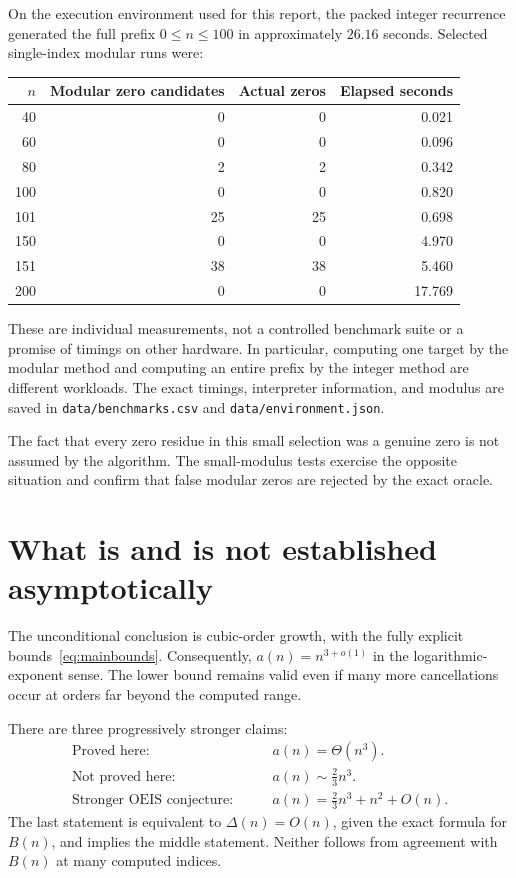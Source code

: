 \documentclass[11pt]{article}
\numberwithin{equation}{section}
\theoremstyle{definition}
\theoremstyle{remark}
\begin{document}
On the execution environment used for this report, the packed integer
recurrence generated the full prefix $0\le n\le100$ in approximately
$26.16$ seconds. Selected single-index modular runs were:
\begin{center}
\begin{tabular}{rrrr}
\toprule
$n$ & Modular zero candidates & Actual zeros & Elapsed seconds\\
\midrule
40 & 0 & 0 & 0.021\\
60 & 0 & 0 & 0.096\\
80 & 2 & 2 & 0.342\\
100 & 0 & 0 & 0.820\\
101 & 25 & 25 & 0.698\\
150 & 0 & 0 & 4.970\\
151 & 38 & 38 & 5.460\\
200 & 0 & 0 & 17.769\\
\bottomrule
\end{tabular}
\end{center}
These are individual measurements, not a controlled benchmark suite or a
promise of timings on other hardware. In particular, computing one target
by the modular method and computing an entire prefix by the integer method
are different workloads. The exact timings, interpreter information, and
modulus are saved in \texttt{data/benchmarks.csv} and
\texttt{data/environment.json}.

The fact that every zero residue in this small selection was a genuine zero
is not assumed by the algorithm. The small-modulus tests exercise the
opposite situation and confirm that false modular zeros are rejected by
the exact oracle.

\section{What is and is not established asymptotically}

The unconditional conclusion is cubic-order growth, with the fully explicit
bounds~\eqref{eq:mainbounds}. Consequently, $a(n)=n^{3+o(1)}$ in the
logarithmic-exponent sense. The lower bound remains valid even if many more
cancellations occur at orders far beyond the computed range.

There are three progressively stronger claims:
\begin{align*}
 \text{Proved here:}\qquad &a(n)=\Theta(n^3).\\
 \text{Not proved here:}\qquad &a(n)\sim\frac23n^3.\\
 \text{Stronger OEIS conjecture:}\qquad
 &a(n)=\frac23n^3+n^2+O(n).
\end{align*}
The last statement is equivalent to $\Delta(n)=O(n)$, given the exact
formula for $B(n)$, and implies the middle statement. Neither follows from
agreement with $B(n)$ at many computed indices.
\end{document}
